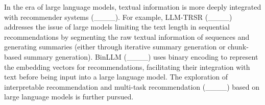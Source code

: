 In the era of large language models, textual information is more deeply integrated with recommender systems (____). For example, LLM-TRSR (____) addresses the issue of large models limiting the text length in sequential recommendations by segmenting the raw textual information of sequences and generating summaries (either through iterative summary generation or chunk-based summary generation).  BinLLM (____) uses binary encoding to represent the embedding vectors for recommendations, facilitating their integration with text before being input into a large language model. The exploration of interpretable recommendation and multi-task recommendation (____) based on large language models is further pursued.